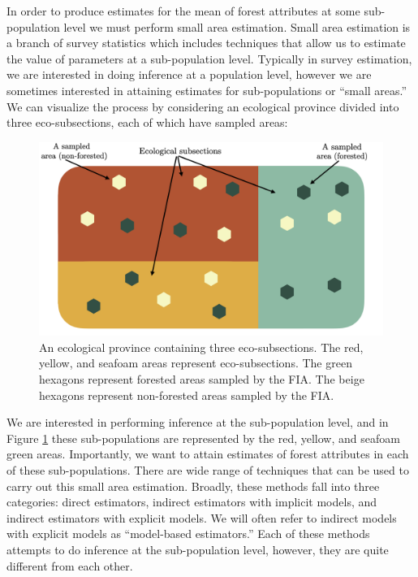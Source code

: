 \documentclass[12pt,twoside]{reedthesis}
\begin{document}
In order to produce estimates for the mean of forest attributes at some sub-population level we must perform small area estimation. Small area estimation is a branch of survey statistics which includes techniques that allow us to estimate the value of parameters at a sub-population level. Typically in survey estimation, we are interested in doing inference at a population level, however we are sometimes interested in attaining estimates for sub-populations or ``small areas.'' We can visualize the process by considering an ecological province divided into three eco-subsections, each of which have sampled areas:
\begin{figure}

{\centering \includegraphics[width=1\linewidth]{figure/ecoprov-diagram} 

}

\caption[An ecological province]{An ecological province containing three eco-subsections. The red, yellow, and seafoam areas represent eco-subsections. The green hexagons represent forested areas sampled by the FIA. The beige hexagons represent non-forested areas sampled by the FIA.}\label{fig:ecological-province-diagram}
\end{figure}
We are interested in performing inference at the sub-population level, and in Figure \ref{fig:ecological-province-diagram} these sub-populations are represented by the red, yellow, and seafoam green areas. Importantly, we want to attain estimates of forest attributes in each of these sub-populations. There are wide range of techniques that can be used to carry out this small area estimation. Broadly, these methods fall into three categories: direct estimators, indirect estimators with implicit models, and indirect estimators with explicit models. We will often refer to indirect models with explicit models as ``model-based estimators.'' Each of these methods attempts to do inference at the sub-population level, however, they are quite different from each other.
\end{document}
